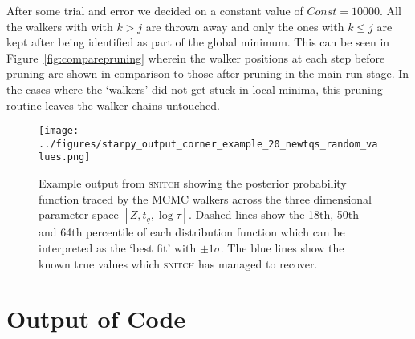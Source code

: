 \documentclass[useAMS,usenatbib]{mn2e}
\begin{document}
After some trial and error we decided on a constant value of $Const = 10000$. All the walkers with with $k>j$ are thrown away and only the ones with $k \leq j$ are kept after being identified as part of the global minimum. This can be seen in Figure~\ref{fig:comparepruning} wherein the walker positions at each step before pruning are shown in comparison to those after pruning in the main run stage. In the cases where the `walkers' did not get stuck in local minima, this pruning routine leaves the walker chains untouched. 


\begin{figure*}
\centering
\texttt{[image: ../figures/starpy\_output\_corner\_example\_20\_newtqs\_random\_values.png]}
\caption{Example output from \textsc{snitch} showing the posterior probability function traced by the MCMC walkers across the three dimensional parameter space $[Z, t_q, \log\tau]$. Dashed lines show the 18th, 50th and 64th percentile of each distribution function which can be interpreted as the `best fit' with $±1\sigma$. The blue lines show the known true values which \textsc{snitch} has managed to recover.}
\label{fig:output}
\end{figure*}

\section{Output of Code}\label{sec:output}


\end{document}
